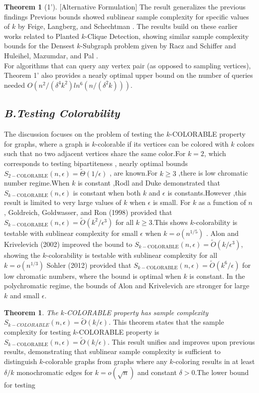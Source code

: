 \documentclass[preprint,11pt]{elsarticle}
\theoremstyle{definition}
\newtheorem{theorem}{Theorem}
\newtheorem*{manualtheorem}{Theorem}
\begin{document}
\begin{multicols}{2}
\begin{manualtheorem}[1'][Alternative Formulation]
 The result generalizes the previous findings Previous bounds showed sublinear sample complexity for specific values of $k$ by Feige, Langberg, and Schechtman \cite{FLS04}. The results build on these earlier works related to Planted $k$-Clique Detection, showing similar sample complexity bounds for the Densest $k$-Subgraph problem given by Racz and Schiffer \cite{RS19} and Huleihel, Mazumdar, and Pal \cite{HMP21}.\\
For algorithms that can query any vertex pair (as opposed to sampling vertices), Theorem 1’ also provides a nearly optimal upper bound on the number of queries needed $O(n^2/(\delta^4k^2)ln^6(n/(\delta^2k)))$.
\end{manualtheorem}
\subsection*{\textit{\textbf{B.Testing Colorability}}}
The discussion focuses on the problem of testing the $k$-COLORABLE property for graphs, where a graph is $k$-colorable if its vertices can be colored with $k$ colors such that no two adjacent vertices share the same color.For $k=2$, which corresponds to testing bipartiteness , nearly optimal bounds $S_{2-\text{COLORABLE}}(n,\epsilon)=\tilde{\Theta}(1/\epsilon)$ \cite{GGR98},\cite{AK02} are known.For $k\geq 3$ ,there is low chromatic number regime.When $k$ is constant ,Rodl and Duke \cite{RD85} demonstrated that $S_{k-\text{COLORABLE}}(n,\epsilon)$
is constant when both $k$ and $\epsilon$ is constants.However ,this result is limited to very large values of $k$ when $\epsilon$ is small. For $k$ as a function of $n$ , Goldreich, Goldwasser, and Ron (1998) \cite{GGR98} provided that $S_{k-\text{COLORABLE}}(n,\epsilon)=\tilde{O}(k^2/\epsilon^3)$ for all $k\geq 3$.This shows $k$-colorability is testable with sublinear complexity for small $\epsilon$ when $k=o(n^{1/5})$ . Alon and Krivelevich (2002) \cite{AK02} improved the bound to $S_{k-\text{COLORABLE}}(n,\epsilon)=\tilde{O}(k/\epsilon^3)$, showing the $k$-colorability is testable with sublinear complexity for all $k=o(n^{1/3})$ Sohler (2012) \cite{Soh12} provided that
$S_{k-\text{COLORABLE}}(n,\epsilon)=\tilde{O}(k^6/\epsilon)$ for low chromatic numbers, where the bound is optimal when $k$ is constant. In the polychromatic regime, the bounds of Alon and Krivelevich are stronger for large $k$ and small $\epsilon$.
\begin{theorem}\textit{The $k$-COLORABLE property has sample complexity $S_{k-COLORABLE}(n,\epsilon)=\tilde{O}(k/\epsilon)$.}
This theorem states  that the sample complexity for testing  $k$-COLORABLE property is $S_{k-\text{COLORABLE}}(n,\epsilon)=\tilde{O}(k/\epsilon)$. This result unifies and improves upon previous results, demonstrating that sublinear sample complexity is sufficient to distinguish $k$-colorable graphs from graphs where any  $k$-coloring results in at least $\delta/k$ monochromatic edges for  $k=o(\sqrt{n})$ and constant $\delta>0$.The lower bound for testing 

\end{theorem}
\end{multicols}
\end{document}
